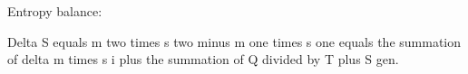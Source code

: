 Entropy balance:  

Delta S equals m two times s two minus m one times s one equals the summation of delta m times s i plus the summation of Q divided by T plus S gen.